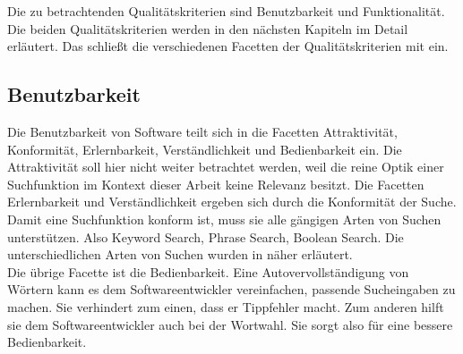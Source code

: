 Die zu betrachtenden Qualitätskriterien sind Benutzbarkeit und Funktionalität.
Die beiden Qualitätskriterien werden in den nächsten Kapiteln im Detail erläutert.
Das schließt die verschiedenen Facetten der Qualitätskriterien mit ein.

\subsection{Benutzbarkeit}
Die Benutzbarkeit von Software teilt sich in die Facetten Attraktivität, Konformität, Erlernbarkeit, Verständlichkeit und Bedienbarkeit ein.
Die Attraktivität soll hier nicht weiter betrachtet werden, weil die reine Optik einer Suchfunktion im Kontext dieser Arbeit keine Relevanz besitzt.
Die Facetten Erlernbarkeit und Verständlichkeit ergeben sich durch die Konformität der Suche.
Damit eine Suchfunktion konform ist, muss sie alle gängigen Arten von Suchen unterstützen.
Also Keyword Search, Phrase Search, Boolean Search.
Die unterschiedlichen Arten von Suchen wurden in  näher erläutert.\\

Die übrige Facette ist die Bedienbarkeit.
Eine Autovervollständigung von Wörtern kann es dem Softwareentwickler vereinfachen, passende Sucheingaben zu machen.
Sie verhindert zum einen, dass er Tippfehler macht.
Zum anderen hilft sie dem Softwareentwickler auch bei der Wortwahl.
Sie sorgt also für eine bessere Bedienbarkeit.\\





